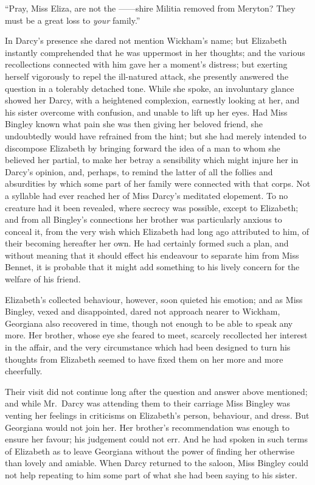 \documentclass[12pt,english,oneside]{book}
\begin{document}
{}``Pray, Miss Eliza, are not the \mbox{------}shire Militia removed
from Meryton? They must be a great loss to \textit{your} family.''

In Darcy's presence she dared not mention Wickham's name; but Elizabeth
instantly comprehended that he was uppermost in her thoughts; and
the various recollections connected with him gave her a moment's distress;
but exerting herself vigorously to repel the ill-natured attack, she
presently answered the question in a tolerably detached tone. While
she spoke, an involuntary glance showed her Darcy, with a heightened
complexion, earnestly looking at her, and his sister overcome with
confusion, and unable to lift up her eyes. Had Miss Bingley known
what pain she was then giving her beloved friend, she undoubtedly
would have refrained from the hint; but she had merely intended to
discompose Elizabeth by bringing forward the idea of a man to whom
she believed her partial, to make her betray a sensibility which might
injure her in Darcy's opinion, and, perhaps, to remind the latter
of all the follies and absurdities by which some part of her family
were connected with that corps. Not a syllable had ever reached her
of Miss Darcy's meditated elopement. To no creature had it been revealed,
where secrecy was possible, except to Elizabeth; and from all Bingley's
connections her brother was particularly anxious to conceal it, from
the very wish which Elizabeth had long ago attributed to him, of their
becoming hereafter her own. He had certainly formed such a plan, and
without meaning that it should effect his endeavour to separate him
from Miss Bennet, it is probable that it might add something to his
lively concern for the welfare of his friend.

Elizabeth's collected behaviour, however, soon quieted his emotion;
and as Miss Bingley, vexed and disappointed, dared not approach nearer
to Wickham, Georgiana also recovered in time, though not enough to
be able to speak any more. Her brother, whose eye she feared to meet,
scarcely recollected her interest in the affair, and the very circumstance
which had been designed to turn his thoughts from Elizabeth seemed
to have fixed them on her more and more cheerfully.

Their visit did not continue long after the question and answer above
mentioned; and while Mr.\ Darcy was attending them to their carriage
Miss Bingley was venting her feelings in criticisms on Elizabeth's
person, behaviour, and dress. But Georgiana would not join her. Her
brother's recommendation was enough to ensure her favour; his judgement
could not err. And he had spoken in such terms of Elizabeth as to
leave Georgiana without the power of finding her otherwise than lovely
and amiable. When Darcy returned to the saloon, Miss Bingley could
not help repeating to him some part of what she had been saying to
his sister.
\end{document}

